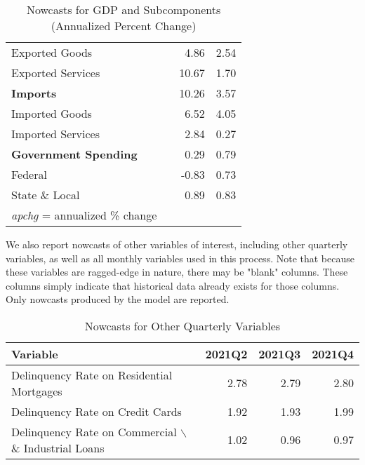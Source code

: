 \documentclass[11pt, letterpaper]{article}\usepackage[]{graphicx}\usepackage[]{color}
\begin{document}
\begin{table}[H]
\begin{tabular}{lrrr}
  \hspace{8mm}  Exported Goods &  & 4.86 & 2.54 \\ 
  \hspace{8mm}  Exported Services &  & 10.67 & 1.70 \\ 
  \hspace{0mm} \textbf{Imports} &  & 10.26 & 3.57 \\ 
  \hspace{8mm}  Imported Goods &  & 6.52 & 4.05 \\ 
  \hspace{8mm}  Imported Services &  & 2.84 & 0.27 \\ 
  \hspace{0mm} \textbf{Government Spending} &  & 0.29 & 0.79 \\ 
  \hspace{8mm}  Federal &  & -0.83 & 0.73 \\ 
  \hspace{8mm}  State \& Local &  & 0.89 & 0.83 \\ 
   \hline 
 \textit{apchg} = annualized \% change 
\end{tabular}
\endgroup
\caption{Nowcasts for GDP and Subcomponents (Annualized Percent Change)} 
\end{table}


We also report nowcasts of other variables of interest, including other quarterly variables, as well as all monthly variables used in this process. Note that because these variables are ragged-edge in nature, there may be "blank" columns. These columns simply indicate that historical data already exists for those columns. Only nowcasts produced by the model are reported.
\begin{table}[H]
\centering
\begingroup\fontsize{11pt}{13pt}\selectfont
\begin{tabular}{lrrr}
  \hline
Variable & 2021Q2 & 2021Q3 & 2021Q4 \\ 
  \hline
Delinquency Rate on Residential Mortgages & 2.78 & 2.79 & 2.80 \\ 
  Delinquency Rate on Credit Cards & 1.92 & 1.93 & 1.99 \\ 
  Delinquency Rate on Commercial $\backslash$\& Industrial Loans & 1.02 & 0.96 & 0.97 \\ 
   \hline
\end{tabular}
\endgroup
\caption{Nowcasts for Other Quarterly Variables} 
\end{table}
\end{document}
